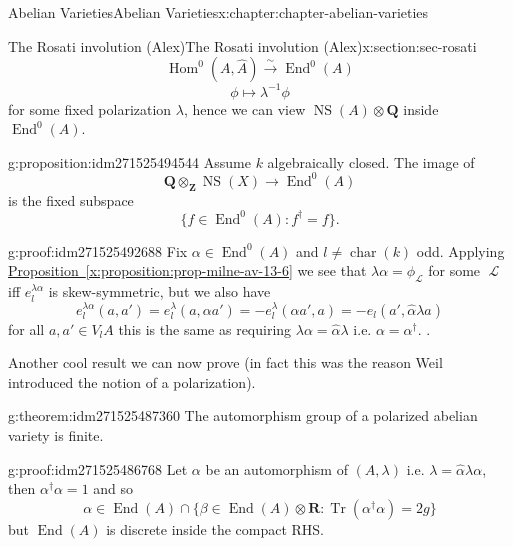 \documentclass[oneside,10pt,]{book}
\numberwithin{equation}{section}
\newcommand{\sheaf}[1]{\operatorname{\mathcal{#1}}}
\newcommand{\inv}{^{-1}}
\newcommand{\ZZ}{\mathbf{Z}}
\newcommand{\QQ}{\mathbf{Q}}
\newcommand{\RR}{\mathbf{R}}
\DeclareMathOperator{\End}{End}
\DeclareMathOperator{\Hom}{Hom}
\DeclareMathOperator{\characteristic}{char}
\DeclareMathOperator{\trace}{Tr}
\DeclareMathOperator{\NS}{NS}
\begin{document}
\begin{chapterptx}{Abelian Varieties}{}{Abelian Varieties}{}{}{x:chapter:chapter-abelian-varieties}
\begin{sectionptx}{The Rosati involution (Alex)}{}{The Rosati involution (Alex)}{}{}{x:section:sec-rosati}
\begin{equation*}
\Hom^0(A, \hat A) \xrightarrow{\sim} \End^0(A)
\end{equation*}
%
\begin{equation*}
\phi \mapsto \lambda\inv \phi
\end{equation*}
for some fixed polarization \(\lambda\), hence we can view \(\NS(A)\otimes \QQ\) inside \(\End^0(A)\).%
\begin{proposition}{}{}{g:proposition:idm271525494544}%
Assume \(k\) algebraically closed. The image of%
\begin{equation*}
\QQ \otimes_\ZZ \NS(X) \to \End^0(A)
\end{equation*}
is the fixed subspace%
\begin{equation*}
\{f \in \End^0(A) : f^\dagger = f\}\text{.}
\end{equation*}
%
\end{proposition}
\begin{proofptx}{}{g:proof:idm271525492688}
Fix \(\alpha \in \End^0(A)\) and \(l\ne \characteristic(k)\) odd. Applying \hyperref[x:proposition:prop-milne-av-13-6]{Proposition~\ref{x:proposition:prop-milne-av-13-6}} we see that \(\lambda \alpha = \phi_{\sheaf L}\) for some \(\sheaf L\) iff \(e^{\lambda\alpha}_l\) is skew-symmetric, but we also have%
\begin{equation*}
e_l^{\lambda\alpha}(a,a')=  e_l^{\lambda}(a,\alpha a') = -e_l^\lambda(\alpha a',a) = -e_l(a', \hat\alpha \lambda a)
\end{equation*}
for all \(a,a' \in V_lA\) this is the same as requiring \(\lambda\alpha = \hat \alpha \lambda\) i.e. \(\alpha = \alpha^\dagger\). .%
\end{proofptx}
Another cool result we can now prove (in fact this was the reason Weil introduced the notion of a polarization).%
\begin{theorem}{}{}{g:theorem:idm271525487360}%
The automorphism group of a polarized abelian variety is finite.%
\end{theorem}
\begin{proofptx}{}{g:proof:idm271525486768}
Let \(\alpha\) be an automorphism of \((A, \lambda)\) i.e. \(\lambda =\hat \alpha  \lambda \alpha\), then \(\alpha^\dagger \alpha= 1\) and so%
\begin{equation*}
\alpha \in \End(A)\cap \{\beta \in \End(A) \otimes \RR: \trace(\alpha^\dagger \alpha) = 2g\}
\end{equation*}
but \(\End(A)\) is discrete inside the compact RHS.%
\end{proofptx}
\end{sectionptx}

\end{chapterptx}
\end{document}
